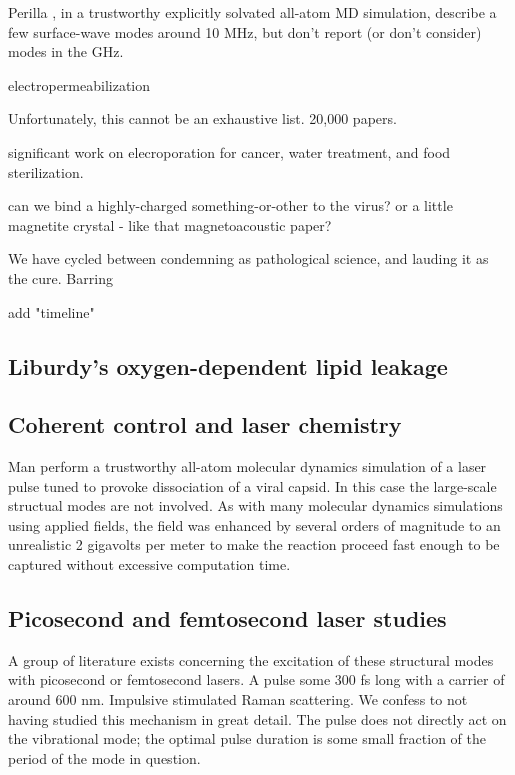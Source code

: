 \documentclass[paper.tex]{subfiles}
\begin{document}
\begin{multicols}{1}
Perilla \cite{}, in a trustworthy explicitly solvated all-atom MD simulation, describe a few surface-wave modes around 10 MHz, but don't report (or don't consider) modes in the GHz.




electropermeabilization




Unfortunately, this cannot be an exhaustive list. 20,000 papers.

significant work on elecroporation for cancer, water treatment, and food sterilization.


can we bind a highly-charged something-or-other to the virus?
or a little magnetite crystal - like that magnetoacoustic paper?


We have cycled between condemning as pathological science, and lauding it as the cure. Barring 


add "timeline"



\subsection{Liburdy's oxygen-dependent lipid leakage}



\subsection{Coherent control and laser chemistry}


Man \cite{Picosecond2016b} perform a trustworthy all-atom molecular dynamics simulation of a laser pulse tuned to provoke dissociation of a viral capsid. In this case the large-scale structual modes are not involved. As with many molecular dynamics simulations using applied fields, the field was enhanced by several orders of magnitude to an unrealistic 2 gigavolts per meter to make the reaction proceed fast enough to be captured without excessive computation time.


\subsection{Picosecond and femtosecond laser studies}

A group of literature exists concerning the excitation of these structural modes with picosecond or femtosecond lasers. A pulse some 300 fs long with a carrier of around 600 nm. Impulsive stimulated Raman scattering. We confess to not having studied this mechanism in great detail. The pulse does not directly act on the vibrational mode; the optimal pulse duration is some small fraction of the period of the mode in question.


\end{multicols}
\end{document}
